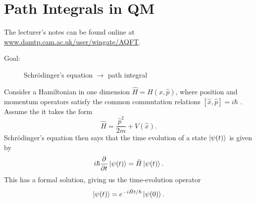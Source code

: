 
\chapter{Path Integrals in QM}%
\label{cha:path_integrals_in_qm}

\begin{leftbar}
  The lecturer's notes can be found online at \url{www.damtp.cam.ac.uk/user/wingate/AQFT}.
\end{leftbar}

\begin{description}
  \item[Goal:] Schr\"odinger's equation $\to$ path integral
\end{description}

Consider a Hamiltonian in one dimension $\hat{H} = H(\hat{x}, \hat{p})$, where position and momentum operators satisfy the common commutation relations $[\hat{x}, \hat{p}] = i \hbar$ .
Assume the it takes the form
\begin{equation}
  \hat{H} = \frac{\hat{p}^2}{2m} + V(\hat{x}).
\end{equation}
Schr\"odinger's equation then says that the time evolution of a state $\ket{\psi(t)}$  is given by
\begin{equation}
  i\hbar \frac{\partial }{\partial t} \ket{\psi(t)} = \hat{H} \ket{\psi(t)}.
\end{equation}
This has a formal solution, giving us the time-evolution operator
\begin{equation}
  \ket{\psi(t)} = e^{-i \hat{H} t / \hbar} \ket{\psi(0)}.
\end{equation}

